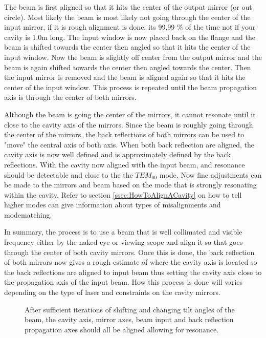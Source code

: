 \documentclass[a4paper]{book}
\begin{document}
The beam is first aligned so that it hits the center of the output mirror (or out circle). Most likely the beam is most likely not going through the center of the input mirror, if it is rough alignment is done, its 99.99 \% of the time not if your cavity is 1.0m long. The input window is now placed back on the flange and the beam is shifted towards the center then angled so that it hits the center of the input window. Now the beam is slightly off center from the output mirror and the beam is again shifted towards the center then angled towards the center. Then the input mirror is removed and the beam is aligned again so that it hits the center of the input window. This process is repeated until the beam propagation axis is through the center of both mirrors. 

Although the beam is going the center of the mirrors, it cannot resonate until it close to the cavity axis of the mirrors. Since the beam is roughly going through the center of the mirrors, the back reflections of both mirrors can be used to "move" the central axis of both axis. When both back reflection are aligned, the cavity axis is now well defined and is approximately defined by the back reflections. With the cavity now aligned with the input beam, and resonance should be detectable and close to the the $TEM_{00}$ mode. Now fine adjustments can be made to the mirrors and beam based on the mode that is strongly resonating within the cavity. Refer to section \ref{ssec:HowToAlignACavity} on how to tell higher modes can give information about types of misalignments and modematching.

In summary, the process is to use a beam that is well collimated and visible frequency either by the naked eye or viewing scope and align it so that goes through the center of both cavity mirrors. Once this is done, the back reflection of both mirrors now gives a rough estimate of where the cavity axis is located so the back reflections are aligned to input beam thus setting the cavity axis close to the propagation axis of the input beam. How this process is done will varies depending on the type of laser and constraints on the cavity mirrors.

\begin{figure} [!ht]
	\centering
	\def\svgwidth{\columnwidth}
	\resizebox{130mm}{!}{}
	\caption{After sufficient iterations of shifting and changing tilt angles of the beam, the cavity axis, mirror axes, beam input and back reflection propagation axes should all be aligned allowing for resonance. }
	\label{fig:cav-align-proper}
\end{figure}
\newpage
\end{document}
